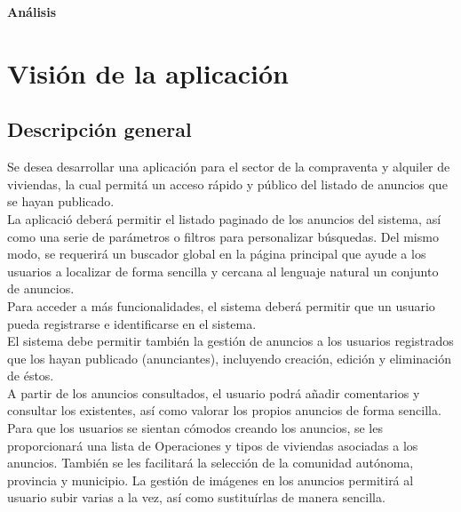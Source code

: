 \newpage{\pagestyle{empty}\cleardoublepage}
\newpage{\pagestyle{empty}\cleardoublepage}
\newpage
\vspace*{\fill}
    \begin{center}
      \thispagestyle{empty} \vspace*{0cm} \textbf{\huge
An\'{a}lisis}
    \end{center}
    \vspace*{\fill}
\newpage{\pagestyle{empty}\cleardoublepage}
\chapter{Visi\'{o}n de la aplicaci\'{o}n}
\section{Descripci\'{o}n general}


Se desea desarrollar una aplicaci\'{o}n para el sector de la compraventa y alquiler de viviendas, la cual permit\'{a} un acceso r\'{a}pido y p\'{u}blico del listado de anuncios que se hayan publicado. \\

La aplicaci\'{o} deber\'{a} permitir el listado paginado de los anuncios del sistema, as\'{i} como una serie de par\'{a}metros o filtros para personalizar b\'{u}squedas. Del mismo modo, se requerir\'{a} un buscador global en la p\'{a}gina principal que ayude a los usuarios a localizar de forma sencilla y cercana al lenguaje natural un conjunto de anuncios.\\

Para acceder a m\'{a}s funcionalidades, el sistema deber\'{a} permitir que un usuario pueda registrarse e identificarse en el sistema.\\

El sistema debe permitir tambi\'{e}n la gesti\'{o}n de anuncios a los usuarios registrados que los hayan publicado (anunciantes), incluyendo creaci\'{o}n, edici\'{o}n y eliminaci\'{o}n de \'{e}stos.\\

A partir de los anuncios consultados, el usuario podr\'{a} a\~{n}adir comentarios y consultar los existentes, as\'{i} como valorar los propios anuncios de forma sencilla.\\

Para que los usuarios se sientan c\'{o}modos creando los anuncios, se les proporcionar\'{a} una lista de Operaciones y tipos de viviendas asociadas a los anuncios. Tambi\'{e}n se les facilitar\'{a} la selecci\'{o}n de la comunidad aut\'{o}noma, provincia y municipio. La gesti\'{o}n de im\'{a}genes en los anuncios permitir\'{a} al usuario subir varias a la vez, as\'{i} como sustitu\'{i}rlas de manera sencilla.\\

